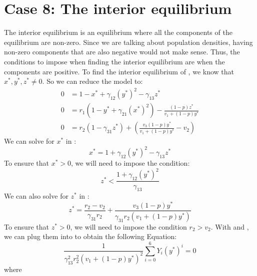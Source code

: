 \section{Case 8: The interior equilibrium}\label{sec:interior_equilibrium}
The interior equilibrium is an equilibrium where all the components of the equilibrium are non-zero. Since we are talking about population densities, having non-zero components that are also negative would not make sense. Thus, the conditions to impose when finding the interior equilibrium are when the components are positive. To find the interior equilibrium of , we know that $x^*,y^*,z^*\neq0$. So we can reduce the model to:
\begin{subequations}
    \begin{align}
        0 &= 1-x^*+\gamma_{12}\left(y^*\right)^2-\gamma_{13}z^*
        \label{eq:4.21a}\\
        0 &= r_1\left(1-y^*+\gamma_{21}\left(x^*\right)^2\right)-\frac{\left(1-p\right)z^*}{v_1+\left(1-p\right)y^*}
        \label{eq:4.21b}\\
        0 &= r_2\left(1-\gamma_{31}z^*\right)+\left(\frac{v_3\left(1-p\right)y^*}{v_1+\left(1-p\right)y^*}-v_2\right)
        \label{eq:4.21c}
    \end{align}
    \label{eq:4.21}
\end{subequations}
We can solve for $x^*$ in :
\begin{equation}
    x^*=1+\gamma_{12}\left(y^*\right)^2-\gamma_{13}z^*
    \label{eq:4.22}
\end{equation}
To ensure that $x^*>0$, we will need to impose the condition:
\[
z^*<\frac{1+\gamma_{12}\left(y^*\right)^2}{\gamma_{13}}
\]
We can also solve for $z^*$ in :
\begin{equation}
    z^*=\frac{r_2-v_2}{\gamma_{31}r_2}+\frac{v_3\left(1-p\right)y^*}{\gamma_{31}r_2\left(v_1+\left(1-p\right)y^*\right)}
    \label{eq:4.23}
\end{equation}
To ensure that $z^*>0$, we will need to impose the condition $r_2>v_2$. With  and , we can plug them into  to obtain the following Equation:
\begin{equation}
    \frac{1}{\gamma_{13}^2r_2^2\left(v_1+\left(1-p\right)y^*\right)^2}\sum_{i=0}^6 Y_i\left(y^*\right)^i=0
    \label{eq:4.24}
\end{equation}
where
